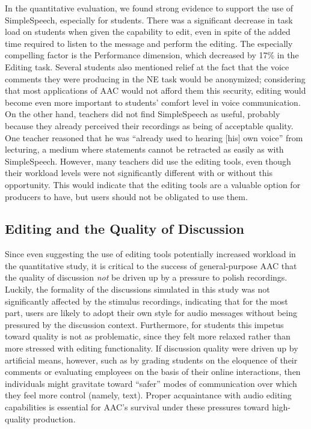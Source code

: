 In the quantitative evaluation, we found strong evidence to support the use of SimpleSpeech, especially for students.
There was a significant decrease in task load on students when given the capability to edit, even in spite of the added time required to listen to the message and perform the editing.
The especially compelling factor is the Performance dimension, which decreased by 17\% in the Editing task. 
Several students also mentioned relief at the fact that the voice comments they were producing in the NE task would be anonymized; considering that most applications of AAC would not afford them this security, editing would become even more important to students' comfort level in voice communication.
On the other hand, teachers did not find SimpleSpeech as useful, probably because they already perceived their recordings as being of acceptable quality. 
One teacher reasoned that he was ``already used to hearing [his] own voice'' from lecturing, a medium where statements cannot be retracted as easily as with SimpleSpeech.
However, many teachers did use the editing tools, even though their workload levels were not significantly different with or without this opportunity.
This would indicate that the editing tools are a valuable option for producers to have, but users should not be obligated to use them.

\subsection{Editing and the Quality of Discussion}
Since even suggesting the use of editing tools potentially increased workload in the quantitative study, it is critical to the success of general-purpose AAC that the quality of discussion \emph{not} be driven up by a pressure to polish recordings.
Luckily, the formality of the discussions simulated in this study was not significantly affected by the stimulus recordings, indicating that for the most part, users are likely to adopt their own style for audio messages without being pressured by the discussion context.
Furthermore, for students this impetus toward quality is not as problematic, since they felt more relaxed rather than more stressed with editing functionality.
If discussion quality were driven up by artificial means, however, such as by grading students on the eloquence of their comments or evaluating employees on the basis of their online interactions, then individuals might gravitate toward ``safer'' modes of communication over which they feel more control (namely, text).
Proper acquaintance with audio editing capabilities is essential for AAC's survival under these pressures toward high-quality production.

